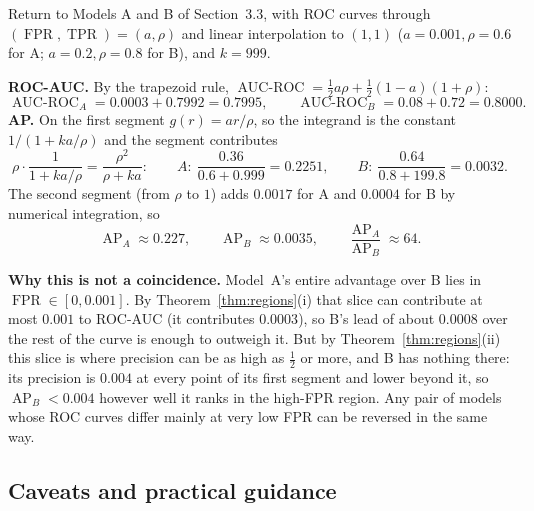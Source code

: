\documentclass[11pt,a4paper]{article}
\DeclareMathOperator{\TPR}{TPR}
\DeclareMathOperator{\FPR}{FPR}
\DeclareMathOperator{\AUROC}{AUC\text{-}ROC}
\DeclareMathOperator{\AP}{AP}
\theoremstyle{plain}
\theoremstyle{definition}
\theoremstyle{remark}
\begin{document}
Return to Models A and B of Section~3.3, with ROC curves through $(\FPR,\TPR)=(a,\rho)$ and linear
interpolation to $(1,1)$ ($a=0.001,\rho=0.6$ for A; $a=0.2,\rho=0.8$ for B), and $k=999$.

\textbf{ROC-AUC.} By the trapezoid rule, $\AUROC=\tfrac12 a\rho+\tfrac12(1-a)(1+\rho)$:
\[
  \AUROC_A=0.0003+0.7992=0.7995,\qquad
  \AUROC_B=0.08+0.72=0.8000 .
\]
\textbf{AP.} On the first segment $g(r)=ar/\rho$, so the integrand is the constant
$1/(1+ka/\rho)$ and the segment contributes
\[
  \rho\cdot\frac{1}{1+ka/\rho}=\frac{\rho^{2}}{\rho+ka}:\qquad
  A:\ \frac{0.36}{0.6+0.999}=0.2251,\qquad
  B:\ \frac{0.64}{0.8+199.8}=0.0032 .
\]
The second segment (from $\rho$ to $1$) adds $0.0017$ for A and $0.0004$ for B by numerical
integration, so
\[
  \AP_A\approx0.227,\qquad \AP_B\approx0.0035,\qquad \frac{\AP_A}{\AP_B}\approx64 .
\]

\textbf{Why this is not a coincidence.} Model~A's entire advantage over B lies in $\FPR\in[0,0.001]$. By
Theorem~\ref{thm:regions}(i) that slice can contribute at most $0.001$ to ROC-AUC (it contributes
$0.0003$), so B's lead of about $0.0008$ over the rest of the curve is enough to outweigh it. But by
Theorem~\ref{thm:regions}(ii) this slice is where precision can be as high as $\tfrac12$ or more, and
B has nothing there: its precision is $0.004$ at every point of its first segment and lower beyond it, so
$\AP_B<0.004$ however well it ranks in the high-FPR region. Any pair of models whose ROC curves differ
mainly at very low FPR can be reversed in the same way.

\subsection{Caveats and practical guidance}
\end{document}
